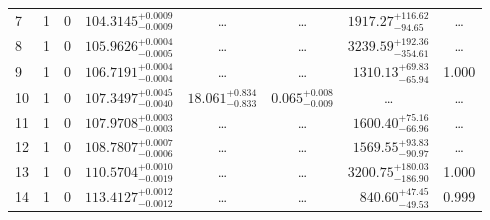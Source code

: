 \begin{table*}[!]
\begin{tabular}{llcrrlrc}
7 & 1 & 0 & $    104.3145_{-      0.0009}^{+      0.0009}$ & \multicolumn{1}{c}{\dots} & \multicolumn{1}{c}{\dots} & $     1917.27_{-       94.65}^{+      116.62}$ & \dots \\[1pt]
8 & 1 & 0 & $    105.9626_{-      0.0005}^{+      0.0004}$ & \multicolumn{1}{c}{\dots} & \multicolumn{1}{c}{\dots} & $     3239.59_{-      354.61}^{+      192.36}$ & \dots \\[1pt]
9 & 1 & 0 & $    106.7191_{-      0.0004}^{+      0.0004}$ & \multicolumn{1}{c}{\dots} & \multicolumn{1}{c}{\dots} & $     1310.13_{-       65.94}^{+       69.83}$ & 1.000 \\[1pt]
10 & 1 & 0 & $    107.3497_{-      0.0040}^{+      0.0045}$ & $      18.061_{-       0.833}^{+       0.834}$ & $       0.065_{-       0.009}^{+       0.008}$ & \multicolumn{1}{c}{\dots} & \dots \\[1pt]
11 & 1 & 0 & $    107.9708_{-      0.0003}^{+      0.0003}$ & \multicolumn{1}{c}{\dots} & \multicolumn{1}{c}{\dots} & $     1600.40_{-       66.96}^{+       75.16}$ & \dots \\[1pt]
12 & 1 & 0 & $    108.7807_{-      0.0006}^{+      0.0007}$ & \multicolumn{1}{c}{\dots} & \multicolumn{1}{c}{\dots} & $     1569.55_{-       90.97}^{+       93.83}$ & \dots \\[1pt]
13 & 1 & 0 & $    110.5704_{-      0.0019}^{+      0.0010}$ & \multicolumn{1}{c}{\dots} & \multicolumn{1}{c}{\dots} & $     3200.75_{-      186.90}^{+      180.03}$ & 1.000\\[1pt]
14 & 1 & 0 & $    113.4127_{-      0.0012}^{+      0.0012}$ & \multicolumn{1}{c}{\dots} & \multicolumn{1}{c}{\dots} & $      840.60_{-       49.53}^{+       47.45}$ & 0.999\\[1pt]


\end{tabular}
\end{table*}
